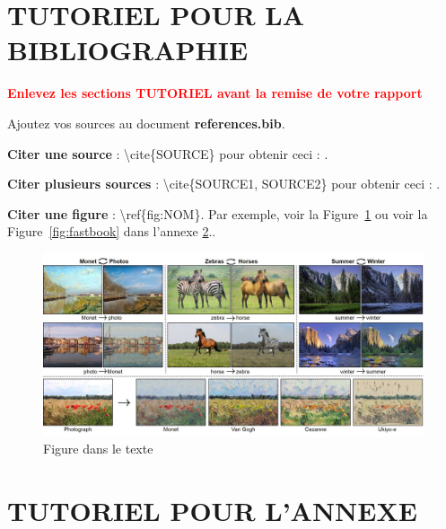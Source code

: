 \documentclass[12pt]{article} 	%
\begin{document}
\section{TUTORIEL POUR LA BIBLIOGRAPHIE}

\textbf{
    \textcolor{red}{
        Enlevez les sections TUTORIEL avant la remise de votre rapport
    }
}

Ajoutez vos sources au document \textbf{references.bib}.

\textbf{Citer une source} : \textbackslash cite\{SOURCE\} pour obtenir ceci :
\cite{howard2020deep}.

\textbf{Citer plusieurs sources} : \textbackslash cite\{SOURCE1, SOURCE2\} pour
obtenir ceci : \cite{goodfellow2014generative, CycleGAN2017}.

\textbf{Citer une figure} : \textbackslash ref\{fig:NOM\}. Par exemple, voir la
Figure~\ref{fig:gan} ou voir la Figure~\ref{fig:fastbook} dans l'annexe \ref{appendix:fastbook}..

\begin{figure}[h!]
    \begin{center}
        \includegraphics[scale=0.4]{img/gan_img.jpg}
    \end{center}
    \caption{Figure dans le texte~\cite{CycleGAN2017}}
    \label{fig:gan}
\end{figure}

\newpage
\appendix

\section{TUTORIEL POUR L'ANNEXE}\label{appendix:fastbook}
\end{document}
